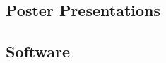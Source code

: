 \documentclass[10pt, letterpaper]{article}
\newcommand{\TablePad}{\vspace{-0.4cm}}
\begin{document}
\subsection{Poster Presentations}
\TablePad
\begin{refsection}

  
  

\end{refsection}

\subsection{Software}
\TablePad
\begin{refsection}



  
  
\end{refsection}


\end{document}
